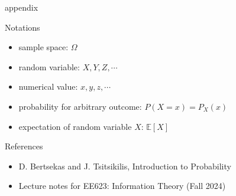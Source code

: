 \documentclass[9pt]{beamer}
\begin{document}
    \begin{frame}{appendix}
      \begin{block}{Notations}
        \begin{itemize}
          \item sample space: $\Omega$
          \item random variable: $X, Y, Z, \cdots$
          \item numerical value: $x, y, z, \cdots$
          \item probability for arbitrary outcome: $P(X=x)  = P_X(x)$
          \item expectation of random variable $X$: $\mathbb E[X]$
        \end{itemize}
      \end{block}
    \end{frame}

    \begin{frame}{References}
      \begin{itemize}
        \item D. Bertsekas and J. Tsitsikilis, Introduction to Probability
        \item Lecture notes for EE623: Information Theory (Fall 2024)
    \end{itemize}
    \vspace{6cm}
    \end{frame}
\end{document}
